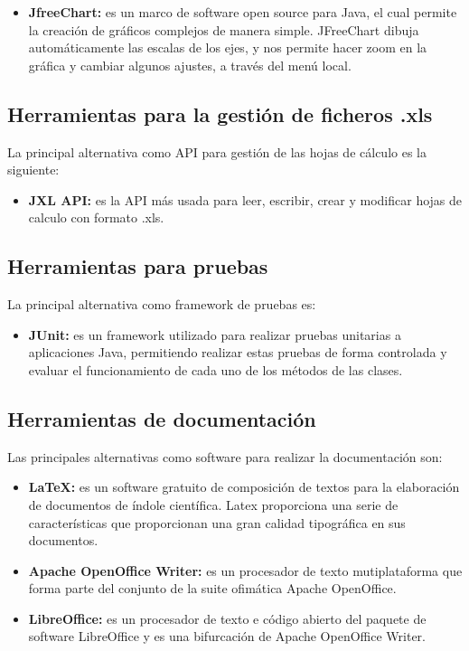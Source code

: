 \documentclass[12pt, a4paper]{book}
\begin{document}
\begin{itemize}
	\item \textbf{JfreeChart:} es un marco de software open source para Java, el cual permite la creación de gráficos complejos de manera simple. JFreeChart dibuja automáticamente las escalas de los ejes, y nos permite hacer zoom en la gráfica y cambiar algunos ajustes, a través del menú local.
\end{itemize}


\subsection{Herramientas para la gestión de ficheros .xls}

La principal alternativa como \gls{API} para gestión de las hojas de cálculo es la siguiente:

\begin{itemize}
	\item \textbf{JXL API:} es la \gls{API} más usada para leer, escribir, crear y modificar hojas de calculo con formato .xls.
\end{itemize}

\subsection{Herramientas para pruebas}

La principal alternativa como framework de pruebas es:

\begin{itemize}
	\item \textbf{JUnit:} es un framework utilizado para realizar pruebas unitarias a aplicaciones Java, permitiendo realizar estas pruebas de forma controlada y evaluar el funcionamiento de cada uno de los métodos de las clases.
\end{itemize}

\subsection{Herramientas de documentación}

Las principales alternativas como software para realizar la documentación son:

\begin{itemize}
	\item \textbf{LaTeX:} es un software gratuito de composición de textos para la elaboración de documentos de índole científica. Latex proporciona una serie de características que proporcionan una gran calidad tipográfica en sus documentos.
	
	\item \textbf{Apache OpenOffice Writer:} es un procesador de texto mutiplataforma que forma parte del conjunto de la suite ofimática Apache OpenOffice.
	
	\item \textbf{LibreOffice:} es un procesador de texto e código abierto del paquete de software LibreOffice y es una bifurcación de Apache OpenOffice Writer.
	
\end{itemize}
\end{document}
